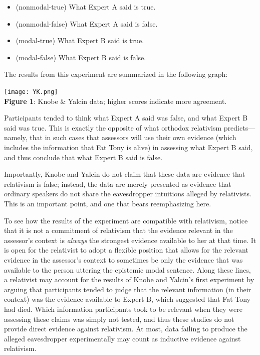 \documentclass[11pt]{article}
\begin{document}
\begin{doublespace}
\begin{itemize}
\item (nonmodal-true) What Expert A said is true. 
\item (nonmodal-false) What Expert A said is false. 
\item (modal-true) What Expert B said is true. 
\item (modal-false) What Expert B said is false.
\end{itemize}

\noindent The results from this experiment are summarized in the following graph:

\begin{center}
\texttt{[image: YK.png]} \\ {\bf Figure 1}: Knobe \& Yalcin data; higher scores indicate more agreement.
\end{center}

\noindent Participants tended to think what Expert A said was false, and what Expert B said was true. This is exactly the opposite of what orthodox relativism predicts---namely, that in such cases that assessors will use their own evidence (which includes the information that Fat Tony is alive) in assessing what Expert B said, and thus conclude that what Expert B said is false. %

Importantly, Knobe and Yalcin do not claim that these data are evidence that relativism is false; instead, the data are merely presented as evidence that ordinary speakers do not share the eavesdropper intuitions alleged by relativists. This is an important point, and one that bears reemphasizing here.

To see how the results of the experiment are compatible with relativism, notice that it is not a commitment of relativism that the evidence relevant in the assessor's context is {\it always} the strongest evidence available to her at that time. It is open for the relativist to adopt a flexible position that allows for the relevant evidence in the assessor's context to sometimes be only the evidence that was available to the person uttering the epistemic modal sentence. Along these lines, a relativist may account for the results of Knobe and Yalcin's first experiment by arguing that participants tended to judge that the relevant information (in their context) was the evidence available to Expert B, which suggested that Fat Tony had died. Which information participants took to be relevant when they were assessing these claims was simply not tested, and thus these studies do not provide direct evidence against relativism. At most, data failing to produce the alleged eavesdropper experimentally may count as inductive evidence against relativism. 


\end{doublespace}
\end{document}
